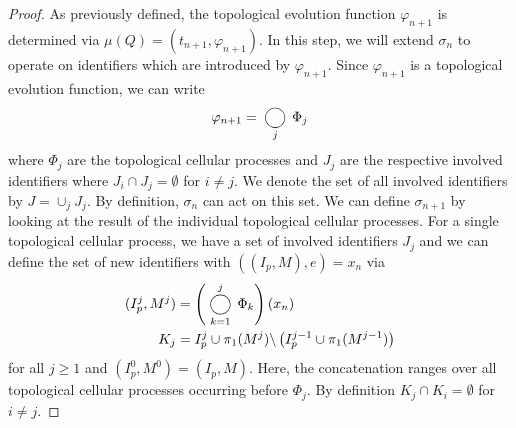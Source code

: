 \begin{proof}
    As previously defined, the topological evolution function $\varphi_{n+1}$ is determined via
    $\mu(Q)=(t_{n+1},\varphi_{n+1})$.
    In this step, we will extend $\sigma_n$ to operate on identifiers which are introduced by
    $\varphi_{n+1}$.
    Since $\varphi_{n+1}$ is a topological evolution function, we can write
    \begin{equation}
        \varphi_{n+1} = \bigcomp_j\Phi_j
    \end{equation}
    where $\Phi_j$ are the topological cellular processes and $J_j$ are the respective involved
    identifiers where $J_i\cap J_j=\emptyset$ for $i\neq j$.
    We denote the set of all involved identifiers by $J=\cup_j J_j$.
    By definition, $\sigma_n$ can act on this set.
    We can define $\sigma_{n+1}$ by looking at the result of the individual topological cellular
    processes.
    For a single topological cellular process, we have a set of involved identifiers $J_j$ and we
    can define the set of new identifiers with $((I_p,M),e)=x_n$ via
    \begin{align}
        (I_p^j,M^j) &= \left(\bigcomp_{k=1}^j\Phi_k\right)(x_n)\\
        K_j &= I_p^j\cup\pi_1(M^j)\backslash\left(I_p^{j-1}\cup\pi_1(M^{j-1})\right)
    \end{align}
    for all $j\geq 1$ and $(I^0_p,M^0)=(I_p,M)$.
    Here, the concatenation ranges over all topological cellular processes occurring before $\Phi_j$.
    By definition $K_j\cap K_i=\emptyset$ for $i\neq j$.


\end{proof}
